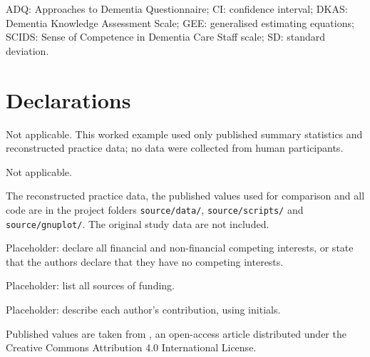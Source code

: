 \documentclass[pdflatex,sn-vancouver-num,referee,lineno]{sn-jnl}
\begin{document}
ADQ: Approaches to Dementia Questionnaire; CI: confidence interval; DKAS: Dementia Knowledge Assessment Scale; GEE: generalised estimating equations; SCIDS: Sense of Competence in Dementia Care Staff scale; SD: standard deviation.

\section*{Declarations}

Not applicable. This worked example used only published summary statistics and reconstructed practice data; no data were collected from human participants.

Not applicable.

The reconstructed practice data, the published values used for comparison and all code are in the project folders \texttt{source/data/}, \texttt{source/scripts/} and \texttt{source/gnuplot/}. The original study data are not included.

Placeholder: declare all financial and non-financial competing interests, or state that the authors declare that they have no competing interests.

Placeholder: list all sources of funding.

Placeholder: describe each author's contribution, using initials.

Published values are taken from \cite{Su2021}, an open-access article distributed under the Creative Commons Attribution 4.0 International License.


\end{document}
